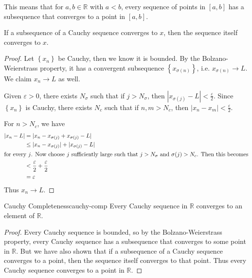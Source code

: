 \documentclass[10pt]{report}
\begin{document}
This means that for $a,b \in \mathbb{R}$ with  $a <b$, every sequence of points in $[a,b]$ has a subsequence that converges to a point in $[a,b]$.

\begin{prop}
	If a subsequence of a Cauchy sequence converges to $x$, then the sequence itself converges to $x$.
\end{prop}
\begin{proof}
	Let $\left\{ x_n \right\}$ be Cauchy, then we know it is bounded. By the Bolzano-Weierstrass property, it has a convergent subsequence $\left\{ x_{\sigma(n)} \right\}$, i.e. $x_{\sigma(n)}\to L$. We claim $x_n \to L$ as well.

	Given $\varepsilon>0$, there exists $N_{\sigma}$ such that if $j > N_\sigma$, then $|x_{\sigma(j)}-L|< \frac{\varepsilon}{2} $. Since $\left\{ x_n \right\}$ is Cauchy, there exists $N_c$ such that if  $n,m > N_c$, then $|x_n-x_m|<\frac{\varepsilon}{2} $.

	For $n > N_c$, we have
	\begin{align*}
		|x_n-L| &= |x_n - x_{\sigma(j)} + x_{\sigma(j)}-L| \\
			&\leq |x_n - x_{\sigma(j)}| + |x_{\sigma(j)}-L| \\
			\intertext{for every $j$. Now choose $j$ sufficiently large such that $j > N_\sigma$ and $\sigma(j)>N_c$. Then this becomes}
			&< \frac{\varepsilon}{2} + \frac{\varepsilon}{2} \\
			&= \varepsilon
	\end{align*}
	Thus $x_n \to L$.
\end{proof}

\begin{thrm}{Cauchy Completeness}{cauchy-comp}
	Every Cauchy sequence in $\mathbb{R}$ converges to an element of $\mathbb{R}$.
\end{thrm}
\begin{proof}
Every Cauchy sequence is bounded, so by the Bolzano-Weierstrass property, every Cauchy sequence has a subsequence that converges to some point in $\mathbb{R}$. But we have also shown that if a subsequence of a Cauchy sequence converges to a point, then the sequence itself converges to that point. Thus every Cauchy sequence converges to a point in $\mathbb{R}$.
\end{proof}




\end{document}
